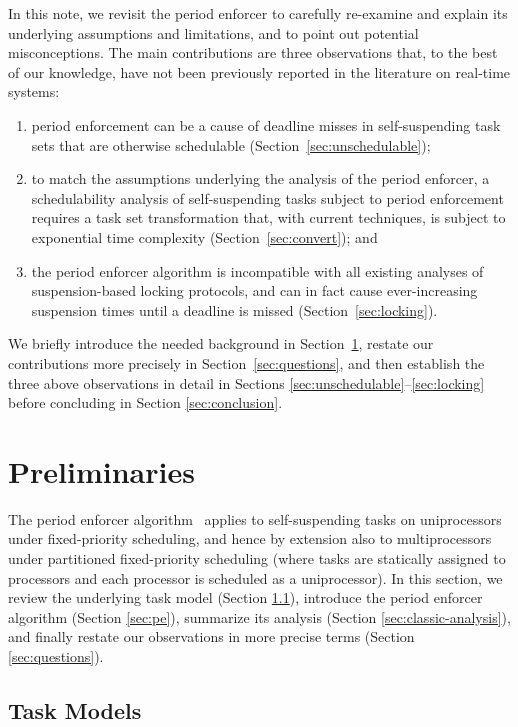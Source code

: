 In this note, we revisit the period enforcer \cite{Raj:suspension1991} to carefully re-examine and explain its underlying assumptions and limitations, and to point out potential misconceptions.  The main contributions are three observations that, to the best of our knowledge, have not been previously reported in the literature on real-time systems:
\begin{enumerate}
	\item period enforcement can be a cause of deadline misses in self-suspending task sets that are otherwise schedulable (Section~\ref{sec:unschedulable}); 
	\item to match the assumptions underlying the analysis of the period enforcer, a schedulability analysis of self-suspending tasks subject to period enforcement requires a task set  transformation that, with current techniques, is subject to exponential time complexity (Section~\ref{sec:convert}); and
	\item the period enforcer algorithm is incompatible with all existing analyses of suspension-based locking protocols, and can in fact cause ever-increasing suspension times until a deadline is missed (Section~\ref{sec:locking}).
\end{enumerate}


We briefly introduce the needed background in Section~\ref{sec:prelim}, restate our contributions more precisely in Section~\ref{sec:questions}, and then establish the three above  observations in detail in Sections \ref{sec:unschedulable}--\ref{sec:locking} before concluding in Section \ref{sec:conclusion}.

\section{Preliminaries}
\label{sec:prelim}

The period enforcer algorithm~\cite{Raj:suspension1991} applies to self-suspending tasks on uniprocessors under fixed-priority scheduling, and hence by extension also to multiprocessors under partitioned fixed-priority scheduling (where tasks are statically assigned to processors and each processor is scheduled as a uniprocessor). In this section, we review the underlying task model (Section \ref{sec:taskmodel}), introduce the period enforcer algorithm (Section \ref{sec:pe}), summarize its analysis (Section \ref{sec:classic-analysis}), and finally restate our observations in more precise terms (Section \ref{sec:questions}).

\subsection{Task Models}
\label{sec:taskmodel}

